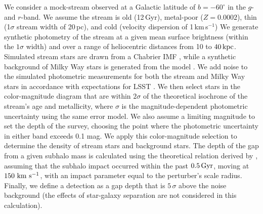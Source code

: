 We consider a mock-stream observed at a Galactic latitude of $b=-60^\circ$ in the $g$- and $r$-band. We assume the stream is old (12\,Gyr), metal-poor ($Z = 0.0002$), thin (1$\sigma$ stream width of 20\,pc), and cold (velocity dispersion of 1\,km\,s$^{-1}$) We generate synthetic photometry of the stream at a given mean surface brightness (within the $1\sigma$ width) and over a range of heliocentric distances from 10 to $40\mathrm{\,kpc}$.  Simulated stream stars are drawn from a Chabrier IMF \citep{2003PASP..115..763C}, while a synthetic background of Milky Way stars is generated from the  model \citep{sharma2011}. 
We add noise to the simulated photometric measurements for both the stream and Milky Way stars in accordance with expectations for LSST \citep{0805.2366}. 
We then select stars in the color-magnitude diagram that are within $2\sigma$ of the theoretical isochrone of the stream's age and metallicity, where $\sigma$ is the magnitude-dependent photometric uncertainty using the same error model. 
We also assume a limiting magnitude to set the depth of the survey, choosing the point where the photometric uncertainty in either band exceeds 0.1 mag. We apply this color-magnitude selection to determine the density of stream stars and background stars.
The depth of the gap from a given subhalo mass is calculated using the theoretical relation derived by \citet{erkal2016}, assuming that the subhalo impact occurred within the past $0.5\mathrm{\,Gyr}$, moving at $150\mathrm{\,\mathrm{\,km}\,\mathrm{\,s}^{-1}}$, with an impact parameter equal to the perturber's scale radius. Finally, we define a detection as a gap depth that is $5\,\sigma$ above the noise background (the effects of star-galaxy separation are not considered in this calculation).

